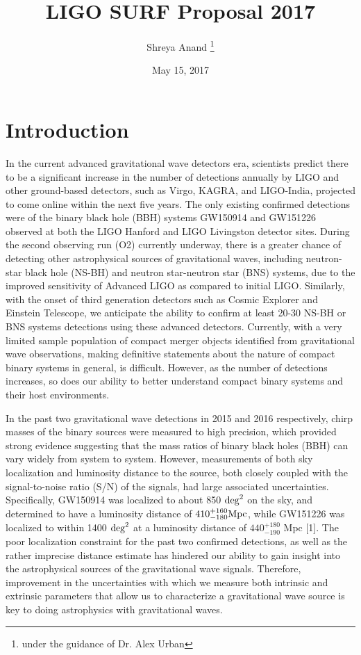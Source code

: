 \documentclass{article}
\title{LIGO SURF Proposal 2017}
\author{Shreya Anand \thanks{under the guidance of Dr. Alex Urban}}
\date{May 15, 2017}
\begin{document}
\begin{titlepage}
\maketitle
\thispagestyle{empty}
\end{titlepage}

\section{Introduction}

In the current advanced gravitational wave detectors era, scientists predict there to be a significant increase in the number of detections annually by LIGO and other ground-based detectors, such as Virgo, KAGRA, and LIGO-India, projected to come online within the next five years.  The only existing confirmed detections were of the binary black hole (BBH) systems GW150914 and GW151226 observed at both the LIGO Hanford and LIGO Livingston detector sites.  During the second observing run (O2) currently underway, there is a greater chance of detecting other astrophysical sources of gravitational waves, including neutron-star black hole (NS-BH) and neutron star-neutron star (BNS) systems, due to the improved sensitivity of Advanced LIGO as compared to initial LIGO.  Similarly, with the onset of third generation detectors such as Cosmic Explorer and Einstein Telescope, we anticipate the ability to confirm at least 20-30 NS-BH or BNS systems detections using these advanced detectors.  Currently, with a very limited sample population of compact merger objects identified from gravitational wave observations, making definitive statements about the nature of compact binary systems in general,  is difficult.  However, as the number of detections increases, so does our ability to better understand compact binary systems and their host environments.

In the past two gravitational wave detections in 2015 and 2016 respectively, chirp masses of the binary sources were measured to high precision, which provided strong evidence suggesting that the mass ratios of binary black holes (BBH) can vary widely from system to system.  However, measurements of both sky localization and luminosity distance to the source, both closely coupled with the signal-to-noise ratio (S/N) of the signals, had large associated uncertainties.  Specifically, GW150914 was localized to about 850 ${\rm deg}^{2}$ on the sky, and determined to have a luminosity distance of $410^{+160}_{-180} {\rm Mpc}$, while GW151226 was localized to within 1400 ${\rm deg}^{2}$ at a luminosity distance of $440^{+180}_{-190}$ Mpc [1].  The poor localization constraint for the past two confirmed detections, as well as the rather imprecise distance estimate has hindered our ability to gain insight into the astrophysical sources of the gravitational wave signals.  Therefore, improvement in the uncertainties with which we measure both intrinsic and extrinsic parameters that allow us to characterize a gravitational wave source is key to doing astrophysics with gravitational waves.      
 
\end{document}
